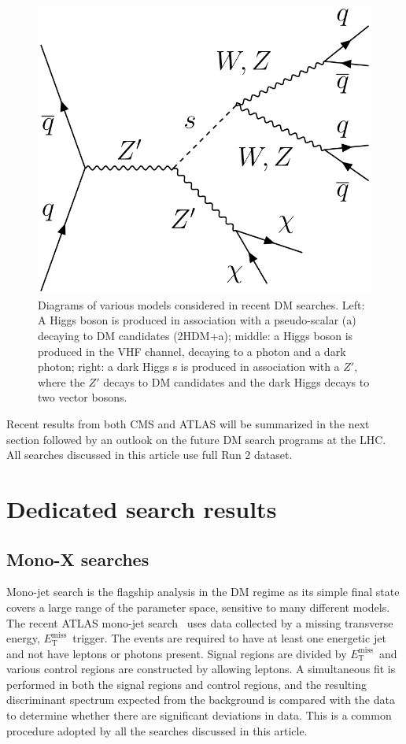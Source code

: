 \documentclass{moriond}
\def\et{E_\mathrm{T}^{\mathrm{miss}}}
\begin{document}
\begin{figure} [htb]
\begin{minipage}{0.32\linewidth}
\centerline{\includegraphics[width=0.7\linewidth]{MonoSVVDiagram}}
\end{minipage}
\caption[]{Diagrams of various models considered in recent DM searches. Left: A Higgs boson is produced in association with a pseudo-scalar (a) decaying to DM candidates (2HDM+a); middle: a Higgs boson is produced in the VHF channel, decaying to a photon and a dark photon; right: a dark Higgs s is produced in association with a $Z\prime$, where the $Z\prime$ decays to DM candidates and the dark Higgs decays to two vector bosons.}
\label{fig:diagrams}
\end{figure}

Recent results from both CMS and ATLAS will be summarized in the next section
followed by an outlook on the future DM search programs at the LHC. All
searches discussed in this article use full Run 2 dataset. 

\section{Dedicated search results}

\subsection{Mono-X searches}

Mono-jet search is the flagship analysis in the DM regime as its simple final
state covers a large range of the parameter space, sensitive to many different
models. The recent ATLAS mono-jet search~\cite{monojet} uses data collected by a missing transverse energy, $\et$\,
trigger. The events are required to have at least one energetic jet and not
have leptons or photons present. Signal regions are divided by $\et$\ and various control regions are constructed by allowing leptons. A simultaneous fit is performed in both the signal regions and control regions, and the resulting discriminant spectrum expected from the background is compared with the data to determine whether there are significant deviations in data. This is a common procedure adopted by all the searches discussed in this article.
\end{document}
